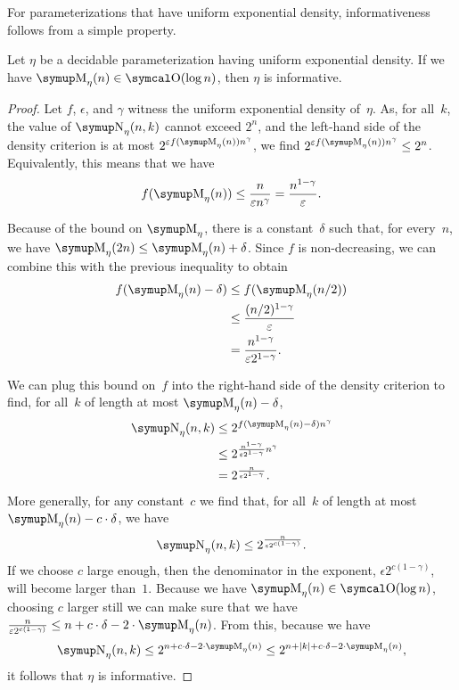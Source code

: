 For parameterizations that have uniform exponential density, informativeness follows from a simple property.
\begin{lemma}
\label{lem:exponentialinformative}%
  Let $\eta$ be a decidable parameterization having uniform exponential density.
  If we have $\upM_\eta(n) \in \bigO(\log n)$, then $\eta$ is informative.
\end{lemma}
\begin{proof}
  Let $f$, $\epsilon$, and $\gamma$ witness the uniform exponential density of~$\eta$.
  As, for all~$k$, the value of $\upN_\eta(n, k)$ cannot exceed $2^n$, and the left-hand side of the density criterion is at most $2^{\epsilon f(\upM_\eta(n)) n^\gamma}$, we find $2^{\epsilon f(\upM_\eta(n)) n^\gamma} \le 2^n$.
  Equivalently, this means that we have
  \begin{equation*}
    f(\upM_\eta(n)) \le \frac{n}{\epsilon n^\gamma} = \frac{n^{1 - \gamma}}{\epsilon}.
  \end{equation*}

  Because of the bound on $\upM_\eta$, there is a constant~$\delta$ such that, for every~$n$, we have $\upM_\eta(2 n) \le \upM_\eta(n) + \delta$.
  Since $f$ is non-decreasing, we can combine this with the previous inequality to obtain
  \begin{align*}
    f(\upM_\eta(n) - \delta) &\le f(\upM_\eta(n / 2)) \\
      &\le \frac{(n / 2)^{1 - \gamma}}{\epsilon} \\
      &= \frac{n^{1 - \gamma}}{\epsilon 2^{1 - \gamma}}.
  \end{align*}

  We can plug this bound on~$f$ into the right-hand side of the density criterion to find, for all~$k$ of length at most $\upM_\eta(n) - \delta$,
  \begin{align*}
    \upN_\eta(n, k) &\le 2^{f(\upM_\eta(n) - \delta) n^\gamma} \\
      &\le 2^{\frac{n^{1 - \gamma}}{\epsilon 2^{1 - \gamma}} n^\gamma} \\
      &= 2^{\frac{n}{\epsilon 2^{1 - \gamma}}}.
  \end{align*}
  More generally, for any constant~$c$ we find that, for all~$k$ of length at most $\upM_\eta(n) - c \cdot \delta$, we have
  \begin{equation*}
    \upN_\eta(n, k) \le 2^{\frac{n}{\epsilon 2^{c(1 - \gamma)}}}.
  \end{equation*}
  If we choose $c$ large enough, then the denominator in the exponent, $\epsilon 2^{c(1 - \gamma)}$, will become larger than~$1$.
  Because we have $\upM_\eta(n) \in \bigO(\log n)$, choosing $c$ larger still we can make sure that we have $\frac{n}{\epsilon 2^{c(1 - \gamma)}} \le n + c \cdot \delta - 2 \cdot \upM_\eta(n)$.
  From this, because we have
  \begin{equation*}
    \upN_\eta(n, k) \le 2^{n + c \cdot \delta - 2 \cdot \upM_\eta(n)} \le 2^{n + \length{k} + c \cdot \delta - 2 \cdot \upM_\eta(n)},
  \end{equation*}
  it follows that $\eta$ is informative.
\end{proof}

